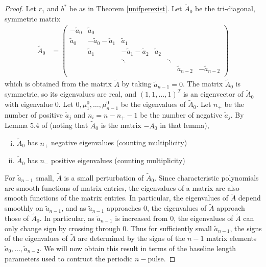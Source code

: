 \documentclass[thesis.tex]{subfiles}
\begin{document}
\begin{lemma}
\begin{proof}
Let $r_1$ and $b^*$ be as in Theorem \ref{unifperexist}. Let $\tilde{A}_0$ be the tri-diagonal, symmetric matrix 
\begin{align*}
\tilde{A}_0 &= \begin{pmatrix}
-\tilde{a}_0 & \tilde{a}_0 \\
\tilde{a}_0 & -\tilde{a}_0 - \tilde{a}_1 &  \tilde{a}_1 \\
& \tilde{a}_1 & -\tilde{a}_1 - \tilde{a}_2 &  \tilde{a}_2 \\
& & \ddots & & \ddots \\
& & & & & \tilde{a}_{n-2} & -\tilde{a}_{n-2} \\
\end{pmatrix}
\end{align*}
which is obtained from the matrix $\tilde{A}$ by taking $\tilde{a}_{n-1} = 0$. The matrix $\tilde{A}_0$ is symmetric, so its eigenvalues are real, and $(1, 1, \dots, 1)^T$ is an eigenvector of $\tilde{A}_0$ with eigenvalue 0. Let $0, \mu^0_1, \dots, \mu^0_{n-1}$ be the eigenvalues of $\tilde{A}_0$. Let $n_+$ be the number of positive $\tilde{a}_j$ and $n_i = n - n_+ - 1$ be the number of negative $\tilde{a}_j$. By Lemma 5.4 of \cite{Sandstede1998} (noting that $\tilde{A}_0$ is the matrix $-A_0$ in that lemma),
\begin{enumerate}[(i)]
\item $\tilde{A}_0$ has $n_+$ negative eigenvalues (counting multiplicity)
\item $\tilde{A}_0$ has $n_-$ positive eigenvalues (counting multiplicity)
\end{enumerate}

For $\tilde{a}_{n-1}$ small, $\tilde{A}$ is a small perturbation of $\tilde{A}_0$. Since characteristic polynomials are smooth functions of matrix entries, the eigenvalues of a matrix are also smooth functions of the matrix entries. In particular, the eigenvalues of $\tilde{A}$ depend smoothly on $\tilde{a}_{n-1}$, and as $\tilde{a}_{n-1}$ approaches 0, the eigenvalues of $\tilde{A}$ approach those of $\tilde{A}_0$. In particular, as $\tilde{a}_{n-1}$ is increased from 0, the eigenvalues of $\tilde{A}$ can only change sign by crossing through 0. Thus for sufficiently small $\tilde{a}_{n-1}$, the signs of the eigenvalues of $\tilde{A}$ are determined by the signs of the $n-1$ matrix elements $\tilde{a}_0, \dots, \tilde{a}_{n-2}$. We will now obtain this result in terms of the baseline length parameters used to contruct the periodic $n-$pulse.


\end{proof}
\end{lemma}
\end{document}
